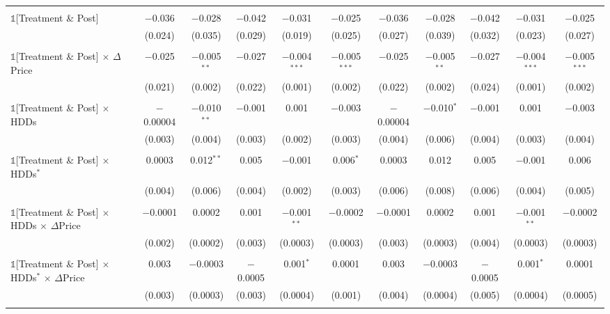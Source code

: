 \begin{table}[!htbp]
\begin{longtable}{@{\extracolsep{0pt}}lcccccccccc}
  & & & & & & & & & & \\ 
 $\mathbb{1}$[Treatment \& Post] & $-$0.036 & $-$0.028 & $-$0.042 & $-$0.031 & $-$0.025 & $-$0.036 & $-$0.028 & $-$0.042 & $-$0.031 & $-$0.025 \\ 
  & (0.024) & (0.035) & (0.029) & (0.019) & (0.025) & (0.027) & (0.039) & (0.032) & (0.023) & (0.027) \\ 
  & & & & & & & & & & \\ 
 $\mathbb{1}$[Treatment \& Post] $\times$ $\Delta$Price & $-$0.025 & $-$0.005$^{**}$ & $-$0.027 & $-$0.004$^{***}$ & $-$0.005$^{***}$ & $-$0.025 & $-$0.005$^{**}$ & $-$0.027 & $-$0.004$^{***}$ & $-$0.005$^{***}$ \\ 
  & (0.021) & (0.002) & (0.022) & (0.001) & (0.002) & (0.022) & (0.002) & (0.024) & (0.001) & (0.002) \\ 
  & & & & & & & & & & \\ 
 $\mathbb{1}$[Treatment \& Post] $\times$ HDDs & $-$0.00004 & $-$0.010$^{**}$ & $-$0.001 & 0.001 & $-$0.003 & $-$0.00004 & $-$0.010$^{*}$ & $-$0.001 & 0.001 & $-$0.003 \\ 
  & (0.003) & (0.004) & (0.003) & (0.002) & (0.003) & (0.004) & (0.006) & (0.004) & (0.003) & (0.004) \\ 
  & & & & & & & & & & \\ 
 $\mathbb{1}$[Treatment \& Post] $\times$ HDDs$^{*}$ & 0.0003 & 0.012$^{**}$ & 0.005 & $-$0.001 & 0.006$^{*}$ & 0.0003 & 0.012 & 0.005 & $-$0.001 & 0.006 \\ 
  & (0.004) & (0.006) & (0.004) & (0.002) & (0.003) & (0.006) & (0.008) & (0.006) & (0.004) & (0.005) \\ 
  & & & & & & & & & & \\ 
 $\mathbb{1}$[Treatment \& Post] $\times$ HDDs $\times$ $\Delta$Price & $-$0.0001 & 0.0002 & 0.001 & $-$0.001$^{**}$ & $-$0.0002 & $-$0.0001 & 0.0002 & 0.001 & $-$0.001$^{**}$ & $-$0.0002 \\ 
  & (0.002) & (0.0002) & (0.003) & (0.0003) & (0.0003) & (0.003) & (0.0003) & (0.004) & (0.0003) & (0.0003) \\ 
  & & & & & & & & & & \\ 
 $\mathbb{1}$[Treatment \& Post] $\times$ HDDs$^{*}$ $\times$ $\Delta$Price & 0.003 & $-$0.0003 & $-$0.0005 & 0.001$^{*}$ & 0.0001 & 0.003 & $-$0.0003 & $-$0.0005 & 0.001$^{*}$ & 0.0001 \\ 
  & (0.003) & (0.0003) & (0.003) & (0.0004) & (0.001) & (0.004) & (0.0004) & (0.005) & (0.0004) & (0.0005) \\ 
  & & & & & & & & & & \\ 

\end{longtable}
\end{table}
